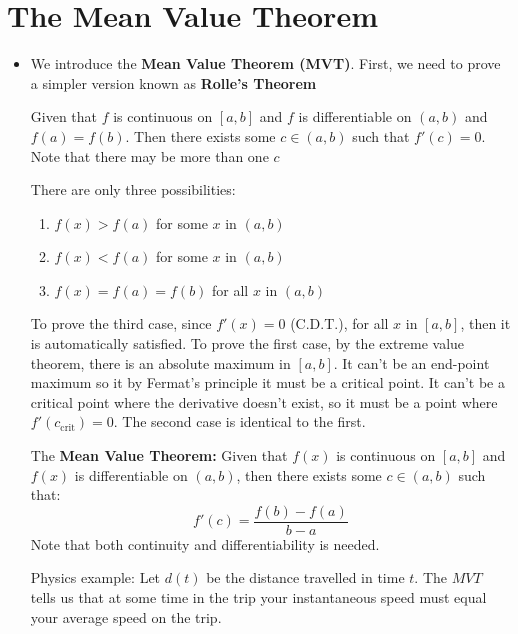 \section{The Mean Value Theorem}
\begin{itemize}
    \item We introduce the \textbf{Mean Value Theorem (MVT)}. First, we need to prove a simpler version known as \textbf{Rolle's Theorem}
    \begin{theorem}
        Given that $f$ is continuous on $[a,b]$ and $f$ is differentiable on $(a,b)$ and $f(a)=f(b)$. Then there exists some $c \in (a,b)$ such that $f'(c)=0$. Note that there may be more than one $c$
    \end{theorem}
    \begin{prooof}
        There are only three possibilities:
        \begin{enumerate}
            \item $f(x)>f(a)$ for some $x$ in $(a,b)$
            \item $f(x)<f(a)$ for some $x$ in $(a,b)$
            \item $f(x)=f(a)=f(b)$ for all $x$ in $(a,b)$
        \end{enumerate}
        To prove the third case, since $f'(x)=0$ (C.D.T.), for all $x$ in $[a,b]$, then it is automatically satisfied. To prove the first case, by the extreme value theorem, there is an absolute maximum in $[a,b]$. It can't be an end-point maximum so it by Fermat's principle it must be a critical point. It can't be a critical point where the derivative doesn't exist, so it must be a point where $f'(c_\text{crit})=0$. The second case is identical to the first.
    \end{prooof}
    \begin{theorem}
        The \textbf{Mean Value Theorem:} Given that $f(x)$ is continuous on $[a,b]$ and $f(x)$ is differentiable on $(a,b)$, then there exists some $c\in (a,b)$ such that:
        \begin{equation}
            f'(c)=\frac{f(b)-f(a)}{b-a}
            \label{eq:}
        \end{equation}
        Note that both continuity and differentiability is needed.
    \end{theorem}
    \begin{example}
        Physics example: Let $d(t)$ be the distance travelled in time $t$. The $MVT$ tells us that at some time in the trip your instantaneous speed must equal your average speed on the trip.
    \end{example}

\end{itemize}
